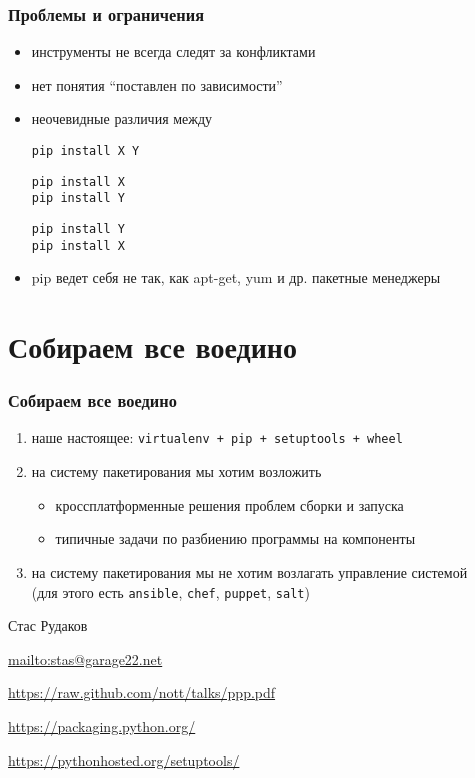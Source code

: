 \documentclass[10pt,pdf,utf8,russian,aspectratio=169,xcolor=dvipsnames,x11names,center]{beamer}
\begin{document}
\begin{frame}[fragile]
  \frametitle{Проблемы и ограничения}

  \begin{itemize}
  \item инструменты не всегда следят за конфликтами
  \item нет понятия ``поставлен по зависимости''
  \item неочевидные различия между
    \begin{lstlisting}[numbers=none]
pip install X Y
    \end{lstlisting}
    \begin{lstlisting}[numbers=none]
pip install X
pip install Y
    \end{lstlisting}
    \begin{lstlisting}[numbers=none]
pip install Y
pip install X
    \end{lstlisting}
  \item pip ведет себя не так, как apt-get, yum и др. пакетные менеджеры
  \end{itemize}

\end{frame}

\section{Собираем все воедино}

\begin{frame}
  \frametitle{Собираем все воедино}

  \begin{enumerate}
  \item наше настоящее: {\tt virtualenv + pip + setuptools + wheel}
  \item на систему пакетирования мы хотим возложить
    \begin{itemize}
    \item кроссплатформенные решения проблем сборки и запуска
    \item типичные задачи по разбиению программы на компоненты
    \end{itemize}
  \item на систему пакетирования мы не хотим возлагать управление системой\\
    (для этого есть {\tt ansible}, {\tt chef}, {\tt puppet}, {\tt salt})
  \end{enumerate}
\end{frame}

\begin{frame}
    \begin{block}{Стас Рудаков}
    \par \url{mailto:stas@garage22.net}
    \par \url{https://raw.github.com/nott/talks/ppp.pdf}
    \end{block}

    \begin{block}
      \par \url{https://packaging.python.org/}
      \par \url{https://pythonhosted.org/setuptools/}
    \end{block}
    
\end{frame}
\end{document}
